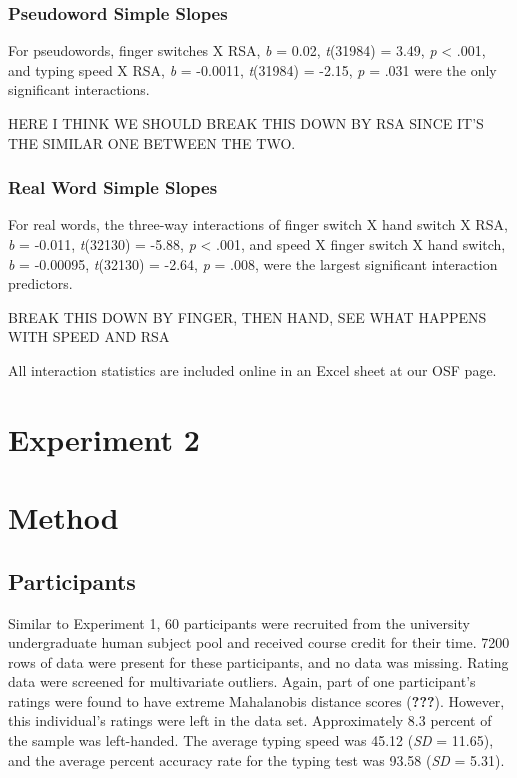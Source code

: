 \documentclass[english,man]{apa6}
\theoremstyle{definition}
\theoremstyle{definition}
\theoremstyle{definition}
\theoremstyle{remark}
\begin{document}
\subsubsection{Pseudoword Simple Slopes}\label{pseudoword-simple-slopes}

For pseudowords, finger switches X RSA, \emph{b} = 0.02, \emph{t}(31984)
= 3.49, \emph{p} \textless{} .001, and typing speed X RSA, \emph{b} =
-0.0011, \emph{t}(31984) = -2.15, \emph{p} = .031 were the only
significant interactions.

HERE I THINK WE SHOULD BREAK THIS DOWN BY RSA SINCE IT'S THE SIMILAR ONE
BETWEEN THE TWO.

\subsubsection{Real Word Simple Slopes}\label{real-word-simple-slopes}

For real words, the three-way interactions of finger switch X hand
switch X RSA, \emph{b} = -0.011, \emph{t}(32130) = -5.88, \emph{p}
\textless{} .001, and speed X finger switch X hand switch, \emph{b} =
-0.00095, \emph{t}(32130) = -2.64, \emph{p} = .008, were the largest
significant interaction predictors.

BREAK THIS DOWN BY FINGER, THEN HAND, SEE WHAT HAPPENS WITH SPEED AND
RSA

All interaction statistics are included online in an Excel sheet at our
OSF page.

\section{Experiment 2}\label{experiment-2}

\section{Method}\label{method-1}

\subsection{Participants}\label{participants-1}

Similar to Experiment 1, 60 participants were recruited from the
university undergraduate human subject pool and received course credit
for their time. 7200 rows of data were present for these participants,
and no data was missing. Rating data were screened for multivariate
outliers. Again, part of one participant's ratings were found to have
extreme Mahalanobis distance scores ({\textbf{???}}). However, this
individual's ratings were left in the data set. Approximately 8.3
percent of the sample was left-handed. The average typing speed was
45.12 (\emph{SD} = 11.65), and the average percent accuracy rate for the
typing test was 93.58 (\emph{SD} = 5.31).
\end{document}
